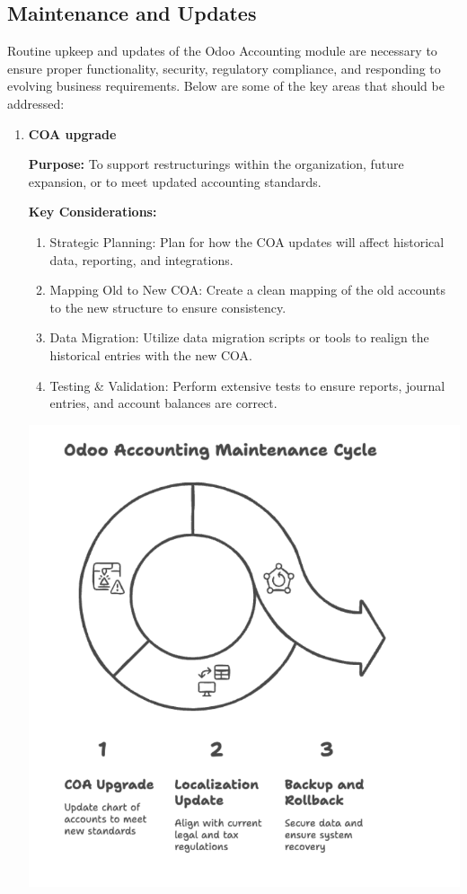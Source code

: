 \documentclass[11pt,a4paper]{article}
\begin{document}
\subsection{Maintenance and Updates}
Routine upkeep and updates of the Odoo Accounting module are necessary to ensure proper 
functionality, security, regulatory compliance, and responding to evolving business requirements. 
Below are some of the key areas that should be addressed:
\medskip
\begin{enumerate}
    \item \textbf{COA upgrade}
    
\begin{minipage}{0.45\textwidth}
    \textbf{Purpose:} To support restructurings within the organization, future expansion, or to meet updated accounting standards.

    \medskip
    \textbf{Key Considerations:}
    \begin{enumerate}
        \item Strategic Planning: Plan for how the COA updates will affect historical data, reporting, and integrations.
        \item Mapping Old to New COA: Create a clean mapping of the old accounts to the new structure to ensure consistency.
        \item Data Migration: Utilize data migration scripts or tools to realign the historical entries with the new COA.
        \item Testing \& Validation: Perform extensive tests to ensure reports, journal entries, and account balances are correct.
    \end{enumerate}
\end{minipage}%
\hfill
\begin{minipage}{0.45\textwidth}
    \centering
    \includegraphics[width=\linewidth]{diagram/odoo_accounting_maintenance_cycle.png}
\end{minipage}


\end{enumerate}
\end{document}
